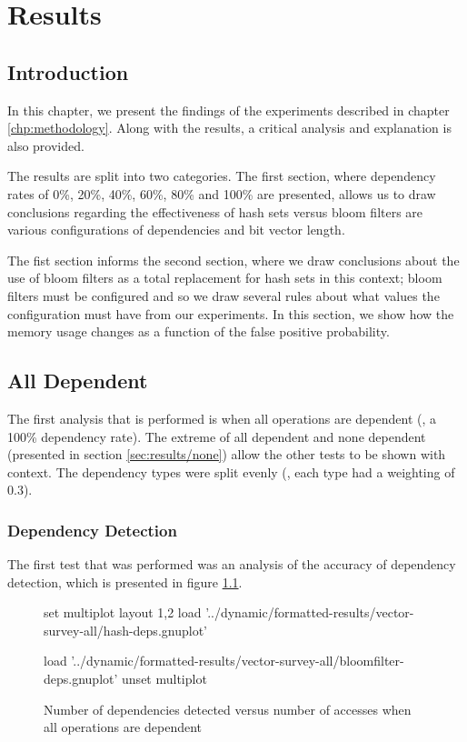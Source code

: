 \chapter{Results} \label{chp:results}
\section{Introduction} \label{sec:results/introduction}
In this chapter, we present the findings of the experiments described in chapter \ref{chp:methodology}. Along with the results, a critical analysis and explanation is also provided.

The results are split into two categories. The first section, where dependency rates of 0\%, 20\%, 40\%, 60\%, 80\% and 100\% are presented, allows us to draw conclusions regarding the effectiveness of hash sets versus bloom filters are various configurations of dependencies and bit vector length.

The fist section informs the second section, where we draw conclusions about the use of bloom filters as a total replacement for hash sets in this context; bloom filters must be configured and so we draw several rules about what values the configuration must have from our experiments. In this section, we show how the memory usage changes as a function of the false positive probability.

\section{All Dependent} \label{sec:result/all}
	The first analysis that is performed is when all operations are dependent (\ie, a 100\% dependency rate). The extreme of all dependent and none dependent (presented in section \ref{sec:results/none}) allow the other tests to be shown with context. The dependency types were split evenly (\ie, each type had a weighting of 0.3).

	\subsection{Dependency Detection} \label{sec:results/all/deps}
	The first test that was performed was an analysis of the accuracy of dependency detection, which is presented in figure \ref{chart:all-dep}.
	
	\begin{figure}
		\centering
		\begin{gnuplot}[terminal=pdf]
			set multiplot layout 1,2
				load '../dynamic/formatted-results/vector-survey-all/hash-deps.gnuplot'
				
				load '../dynamic/formatted-results/vector-survey-all/bloomfilter-deps.gnuplot'
			unset multiplot
		\end{gnuplot}
		\caption{Number of dependencies detected versus number of accesses when all operations are dependent}
		\label{chart:all-dep}
	\end{figure}
	
